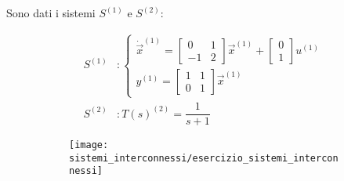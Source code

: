 \documentclass[../main.tex]{subfiles}
\begin{document}
		\begin{mdframed}[style=Exercise]
			\begin{Exercise}[title={Studiare propriet\'a di sistemi interconnessi}, difficulty=3]
				Sono dati i sistemi $ S^{(1)} $ e $ S^{(2)} $:
				\begin{figure}[H]
					\begin{subfigure}{0.5\textwidth}
						\[
							\begin{aligned}
								S^{(1)}&:
								\begin{cases}
									\dot{\vec x}^{(1)} =
									\begin{bmatrix}
										0 & 1\\
										-1 & 2
									\end{bmatrix}
									\vec x^{(1)} +
									\begin{bmatrix}
										0\\
										1
									\end{bmatrix} u^{(1)}
									\\[.5cm]
									y^{(1)} =
									\begin{bmatrix}
										1 & 1\\
										0 & 1
									\end{bmatrix} \vec x^{(1)}
								\end{cases}
								\\
								S^{(2)}&: T(s)^{(2)}=\dfrac{1}{s+1}
							\end{aligned}
						\]
					\end{subfigure}
					\begin{subfigure}{0.4\textwidth}
						\texttt{[image: sistemi\_interconnessi/esercizio\_sistemi\_interconnessi]}	
					\end{subfigure}
				\end{figure}
			

\end{Exercise}
\end{mdframed}
\end{document}

